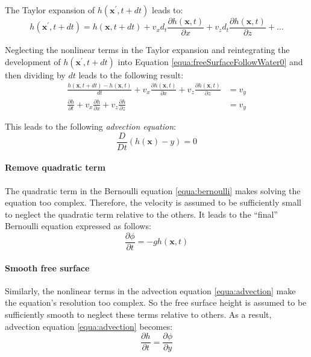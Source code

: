 \documentclass[final]{jcgt}
\begin{document}
The Taylor expansion of $h(\mathbf{x^{\prime}}, t + dt)$ leads to:
\begin{equation}
	h(\mathbf{x^{\prime}}, t + dt) = h(\mathbf{x}, t + dt) + v_xd_t\frac{\partial h(\mathbf{x}, t)}{\partial x} + v_zd_t\frac{\partial h(\mathbf{x}, t)}{\partial z} + \ldots
\end{equation}

Neglecting the nonlinear terms in the Taylor expansion and reintegrating the development of $h(\mathbf{x^{\prime}}, t + dt)$ into Equation \ref{equa:freeSurfaceFollowWater0} and then dividing by $dt$ leads to the following result:
\begin{equation}
	\begin{aligned}
		\frac{h(\mathbf x, t + dt) - h(\mathbf x, t)}{dt} + v_x\frac{\partial h(\mathbf x, t)}{\partial x} + v_z\frac{\partial h(\mathbf x, t)}{\partial z} & = v_y \\
		\frac{\partial h}{\partial t} + v_x\frac{\partial h}{\partial x} + v_z\frac{\partial h}{\partial z}                                                 & = v_y
	\end{aligned}
\end{equation}

This leads to the following \emph{advection equation}:
\begin{equation}
	\frac{D}{Dt}(h(\mathbf x) - y) = 0
	\label{equa:advection}
\end{equation}

\paragraph{Remove quadratic term}
The quadratic term in the Bernoulli equation \ref{equa:bernoulli} makes solving the equation too complex.
Therefore, the velocity is assumed to be sufficiently small to neglect the quadratic term relative to the others.
It leads to the “final” Bernoulli equation expressed as follows:
\begin{equation}
	\frac{\partial \phi}{\partial t} = -gh(\mathbf x,t) \label{equa:bernoulliS}
\end{equation}

\paragraph{Smooth free surface}
Similarly, the nonlinear terms in the advection equation \ref{equa:advection} make the equation's resolution too complex.
So the free surface height is assumed to be sufficiently smooth to neglect these terms relative to others.
As a result, advection equation \ref{equa:advection} becomes:
\begin{equation}
	\frac{\partial h}{\partial t} = \frac{\partial \phi}{\partial y} \label{equa:advectionS}
\end{equation}
\end{document}
